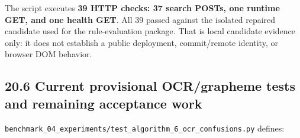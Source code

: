 The script executes \textbf{39 HTTP checks: 37 search POSTs, one runtime GET, and one
health GET}. All 39 passed against the isolated repaired candidate used for the
rule-evaluation package. That is local candidate evidence only: it does not
establish a public deployment, commit/remote identity, or browser DOM behavior.

\subsection{20.6 Current provisional OCR/grapheme tests and remaining acceptance work}\label{206-current-provisional-ocrgrapheme-tests-and-remaining-acceptance-work}

\texttt{benchmark\_\allowbreak{}04\_\allowbreak{}experiments/test\_\allowbreak{}algorithm\_\allowbreak{}6\_\allowbreak{}ocr\_\allowbreak{}confusions.py} defines:

